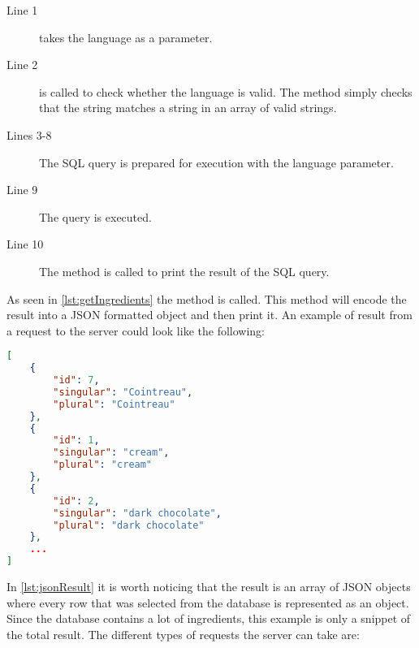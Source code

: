 \begin{description}
\item[Line 1]  takes the language as a parameter.
\item[Line 2]  is called to check whether the language is valid. The method simply checks that the string matches a string in an array of valid strings.
\item[Lines 3-8] The SQL query is prepared for execution with the language parameter.
\item[Line 9] The query is executed.
\item[Line 10] The  method is called to print the result of the SQL query.
\end{description}

As seen in \autoref{lst:getIngredients} the method  is called. This method will encode the result into a JSON formatted object and then print it. An example of result from a request to the server could look like the following:

\begin{lstlisting}[language=json, label=lst:jsonResult, caption=Example result from \colorbox{background}{getIngredients()}]
[
    {
        "id": 7,
        "singular": "Cointreau",
        "plural": "Cointreau"
    },
    {
        "id": 1,
        "singular": "cream",
        "plural": "cream"
    },
    {
        "id": 2,
        "singular": "dark chocolate",
        "plural": "dark chocolate"
    },
    ...
]
\end{lstlisting}

In \autoref{lst:jsonResult} it is worth noticing that the result is an array of JSON objects where every row that was selected from the database is represented as an object. Since the database contains a lot of ingredients, this example is only a snippet of the total result. The different types of requests the server can take are:

